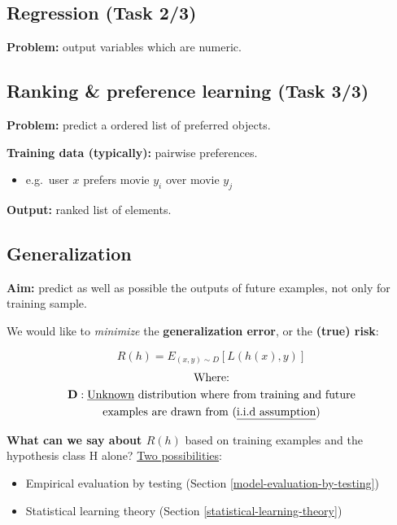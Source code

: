 \documentclass[12pt]{article}
\begin{document}
\subsection{Regression (Task 2/3) }\label{regression}

\textbf{Problem:} output variables which are numeric.





\subsection{Ranking \& preference learning (Task 3/3)
}\label{ranking-preference-learning}

\textbf{Problem:} predict a ordered list of preferred objects.

\textbf{Training data (typically):} pairwise preferences.

\begin{itemize}
  \item e.g.~user $x$ prefers movie $y_i$ over movie $y_j$
\end{itemize}

\textbf{Output:} ranked list of elements.




\subsection{Generalization}\label{generalization}

\textbf{Aim:} predict as well as possible the outputs of future
examples, not only for training sample.

We would like to \emph{minimize} the \textbf{generalization error}, or
the \textbf{(true) risk}:

\begin{equation} \label{eq:1}
  R(h) = E_{(x,y) \sim D}[L(h(x), y)]
\end{equation}
\begin{gather*}
  \text{Where:} \\
  \textbf{D}: \text{\underline{Unknown} distribution where from training and future} \\ \text{examples are drawn from (\underline{i.i.d assumption})}
\end{gather*}

\textbf{What can we say about $R(h)$} based on training examples and the
hypothesis class H alone? \underline{Two possibilities}:

\begin{itemize}
  \item Empirical evaluation by testing (Section \ref{model-evaluation-by-testing})
  \item Statistical learning theory (Section \ref{statistical-learning-theory})
\end{itemize}
\end{document}
